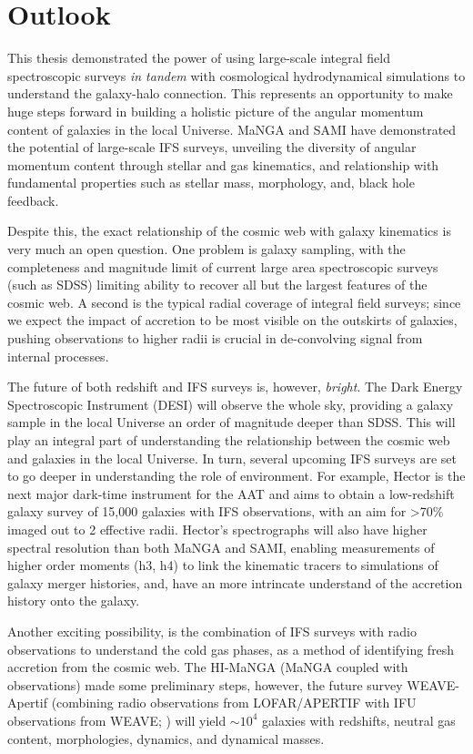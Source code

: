 \section{Outlook}

This thesis demonstrated the power of using large-scale integral field spectroscopic surveys \textit{in tandem} with cosmological hydrodynamical simulations to understand the galaxy-halo connection. This represents an opportunity to make huge steps forward in building a holistic picture of the angular momentum content of galaxies in the local Universe. MaNGA and SAMI have demonstrated the potential of large-scale IFS surveys, unveiling the diversity of angular momentum content through stellar and gas kinematics, and relationship with fundamental properties such as stellar mass, morphology, and, black hole feedback. 

Despite this, the exact relationship of the cosmic web with galaxy kinematics is very much an open question. One problem is galaxy sampling, with the completeness and magnitude limit of current large area spectroscopic surveys (such as SDSS) limiting ability to recover all but the largest features of the cosmic web. A second is the typical radial coverage of integral field surveys; since we expect the impact of accretion to be most visible on the outskirts of galaxies, pushing observations to higher radii is crucial in de-convolving signal from internal processes. 

The future of both redshift and IFS surveys is, however, \textit{bright}. The Dark Energy Spectroscopic Instrument (DESI) will observe the whole sky, providing a galaxy sample in the local Universe an order of magnitude deeper than SDSS. This will play an integral part of understanding the relationship between the cosmic web and galaxies in the local Universe. In turn, several upcoming IFS surveys are set to go deeper in understanding the role of environment. For example, Hector is the next major dark-time instrument for the AAT and aims to obtain a low-redshift galaxy survey of 15,000 galaxies with IFS observations, with an aim for >70\% imaged out to 2 effective radii. Hector's spectrographs will also have higher spectral resolution than both MaNGA and SAMI, enabling measurements of higher order moments (h3, h4) to link the kinematic tracers to simulations of galaxy merger histories, and, have an more intrincate understand of the accretion history onto the galaxy. 

Another exciting possibility, is the combination of IFS surveys with radio observations to understand the cold gas phases, as a method of identifying fresh accretion from the cosmic web. The HI-MaNGA (MaNGA coupled with  observations) made some preliminary steps, however, the future survey WEAVE-Apertif (combining radio observations from LOFAR/APERTIF with IFU observations from WEAVE; ) will yield $\sim10^4$ galaxies with redshifts, neutral gas content, morphologies, dynamics, and dynamical masses. 

